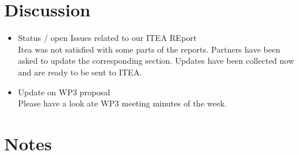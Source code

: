 \documentclass[a4paper, 11pt]{article}
\begin{document}
\section{Discussion}
\begin{itemize}
\item Status / open Issues related to our ITEA REport\\
Itea was not satisfied with some parts of the reports. Partners have been asked to update the corresponding section. Updates have been collected now and are ready to be sent to ITEA.

\item Update on WP3 proposal\\
Please have a look ate WP3 meeting minutes of the week.

\end{itemize}

\section{Notes}
\end{document}
